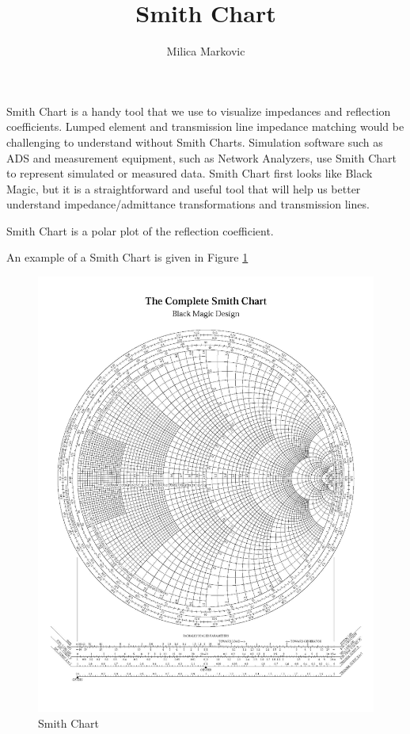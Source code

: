 \documentclass{ximera}
\title{Smith Chart}
\author{Milica Markovic}
\begin{document}
  
\begin{abstract}  

\end{abstract}  
\maketitle    







Smith Chart is a handy tool that we use to visualize impedances and reflection coefficients. Lumped element and transmission line impedance matching would be challenging to understand without Smith Charts. Simulation software such as ADS and measurement equipment, such as Network Analyzers, use Smith Chart to represent simulated or measured data.   Smith Chart first looks like Black Magic, but it is a straightforward and useful tool that will help us better understand impedance/admittance transformations and transmission lines. 

\begin{definition}
Smith Chart is a polar plot of the reflection coefficient.
\end{definition}

An example of a Smith Chart is given in Figure \ref{fig:SC1}




\begin{figure}[htbp]
\begin{center}
\includegraphics[scale=0.05]{../jpg/SmithChartImped-01.jpg}
\end{center}
\caption{Smith Chart} \label{fig:SC1}
\end{figure}
\end{document}
